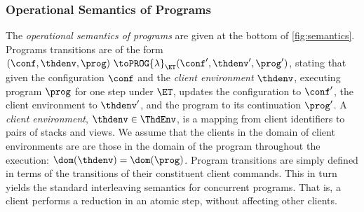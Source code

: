 \subsubsection{Operational Semantics of Programs}

The \emph{operational semantics of programs} are given at the bottom of \cref{fig:semantics}. 
Programs transitions are of the form $(\conf,  \thdenv, \prog) \ \toPROG{\lambda}_{\ET} (\conf',  \thdenv', \prog')$,
stating that given the configuration $\conf$ and the \emph{client environment} $\thdenv$, executing program $\prog$ for one step under $\ET$, updates the configuration to $\conf'$, the client environment to $\thdenv'$, and the program to its continuation $\prog'$. 
A \emph{client environment}, $\thdenv \in \ThdEnv$, is a mapping from client identifiers to pairs of stacks and views. 
We assume that the clients in the domain of client environments are are those in the domain of the program throughout the execution: 
$\dom(\thdenv) = \dom(\prog)$.
Program transitions are simply defined in terms of the transitions of their constituent client commands.
This in turn yields the standard interleaving semantics for concurrent programs. 
That is, a client performs a reduction in an atomic step, without affecting other clients.

